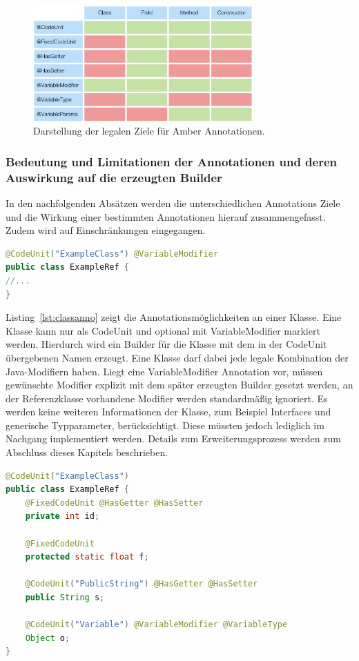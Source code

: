 \documentclass[12pt,oneside,a4paper,parskip]{scrbook}
\begin{document}
\begin{figure}[htbp]
	\centering
	\includegraphics[width=0.75\textwidth]{bilder/tblAnnoTrgt}
	\caption{Darstellung der legalen Ziele für Amber Annotationen.}
	\label{fig:tblAnnoTrgt}
\end{figure}

\subsubsection{Bedeutung und Limitationen der Annotationen und deren Auswirkung auf die erzeugten Builder}

In den nachfolgenden Absätzen werden die unterschiedlichen Annotations Ziele und die Wirkung einer bestimmten Annotationen hierauf zusammengefasst. Zudem wird auf Einschränkungen eingegangen.

\begin{lstlisting}[label=lst:classanno,
language=java,
firstnumber=1,
caption=Ausschnitthafte Darstellung der Annotationsmöglichkeiten an einer Klasse]
@CodeUnit("ExampleClass") @VariableModifier
public class ExampleRef {
//...
}
\end{lstlisting}

Listing~\ref{lst:classanno} zeigt die Annotationsmöglichkeiten an einer Klasse. Eine Klasse kann nur als CodeUnit und optional mit VariableModifier markiert werden. Hierdurch wird ein Builder für die Klasse mit dem in der CodeUnit übergebenen Namen erzeugt. Eine Klasse darf dabei jede legale Kombination der Java-Modifiern haben. Liegt eine VariableModifier Annotation vor, müssen gewünschte Modifier explizit mit dem später erzeugten Builder gesetzt werden, an der Referenzklasse vorhandene Modifier werden standardmäßig ignoriert. Es werden keine weiteren Informationen der Klasse, zum Beispiel Interfaces und generische Typparameter, berücksichtigt. Diese müssten jedoch lediglich im Nachgang implementiert werden. Details zum Erweiterungsprozess werden zum Abschluss dieses Kapitels beschrieben. 

\begin{lstlisting}[label=lst:fieldanno,
language=java,
firstnumber=1,
caption=Ausschnitthafte Darstellung der Annotationsmöglichkeiten an einer Klasse]
@CodeUnit("ExampleClass")
public class ExampleRef {
	@FixedCodeUnit @HasGetter @HasSetter
	private int id;

	@FixedCodeUnit
	protected static float f;

	@CodeUnit("PublicString") @HasGetter @HasSetter
	public String s;

	@CodeUnit("Variable") @VariableModifier @VariableType
	Object o;
}
\end{lstlisting}
\end{document}
